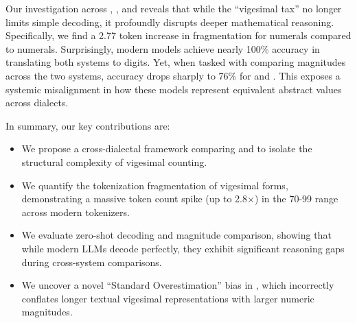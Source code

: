 Our investigation across \gpt, \claude, and \llama reveals that while the ``vigesimal tax'' no longer limits simple decoding, it profoundly disrupts deeper mathematical reasoning. Specifically, we find a 2.77 token increase in fragmentation for \standardfrench numerals compared to \swissfrench numerals. Surprisingly, modern models achieve nearly 100\% accuracy in translating both systems to digits. Yet, when tasked with comparing magnitudes across the two systems, accuracy drops sharply to 76\% for \claude and \llama. This exposes a systemic misalignment in how these models represent equivalent abstract values across dialects.

In summary, our key contributions are:
\begin{itemize}[leftmargin=*,itemsep=0pt,topsep=0pt]
    \item We propose a cross-dialectal framework comparing \standardfrench and \swissfrench to isolate the structural complexity of vigesimal counting.
    \item We quantify the tokenization fragmentation of vigesimal forms, demonstrating a massive token count spike (up to 2.8$\times$) in the 70-99 range across modern tokenizers.
    \item We evaluate zero-shot decoding and magnitude comparison, showing that while modern LLMs decode perfectly, they exhibit significant reasoning gaps during cross-system comparisons.
    \item We uncover a novel ``Standard Overestimation'' bias in \claude, which incorrectly conflates longer textual vigesimal representations with larger numeric magnitudes.
\end{itemize}